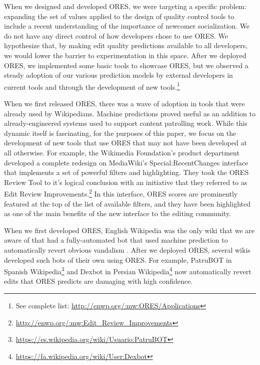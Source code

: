 When we designed and developed ORES, we were targeting a specific problem: expanding the set of values applied to the design of quality control tools to include a recent understanding of the importance of newcomer socialization.  We do not have any direct control of how developers chose to use ORES.  We hypothesize that, by making edit quality predictions available to all developers, we would lower the barrier to experimentation in this space.   After we deployed ORES, we implemented some basic tools to showcase ORES, but we observed a steady adoption of our various prediction models by external developers in current tools and through the development of new tools.\footnote{See complete list: \url{http://enwp.org/:mw:ORES/Applications}}

When we first released ORES, there was a wave of adoption in tools that were already used by Wikipedians.  Machine predictions proved useful as an addition to already-engineered systems used to support content patrolling work.  While this dynamic itself is fascinating, for the purposes of this paper, we focus on the development of new tools that use ORES that may not have been developed at all otherwise.  For example, the Wikimedia Foundation's product department developed a complete redesign on MediaWiki's Special:RecentChanges interface that implements a set of powerful filters and highlighting.  They took the ORES Review Tool to it's logical conclusion with an initiative that they referred to as Edit Review Improvements.\footnote{\url{http://enwp.org/:mw:Edit_Review_Improvements}}  In this interface, ORES scores are prominently featured at the top of the list of available filters, and they have been highlighted as one of the main benefits of the new interface to the editing community.

When we first developed ORES, English Wikipedia was the only wiki that we are aware of that had a fully-automated bot that used machine prediction to automatically revert obvious vandalism \cite{carter2008cluebot}.  After we deployed ORES, several wikis developed such bots of their own using ORES.  For example, PatruBOT in Spanish Wikipedia\footnote{\url{https://es.wikipedia.org/wiki/Usuario:PatruBOT}} and Dexbot in Persian Wikipedia\footnote{\url{https://fa.wikipedia.org/wiki/User:Dexbot}} now automatically revert edits that ORES predicts are damaging with high confidence. 

